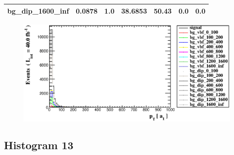 \documentclass[a4paper, 10pt]{article}
\begin{document}
\begin{table}[H]
\begin{center}
\begin{tabular}{|m{23.0mm}|m{23.0mm}|m{18.0mm}|m{19.0mm}|m{19.0mm}|m{19.0mm}|m{19.0mm}|}
      \hline
      {\cellcolor{white}         bg\_dip\_1600\_inf}& {\cellcolor{white}         0.0878}& {\cellcolor{white}         1.0}& {\cellcolor{white}         38.6853}& {\cellcolor{white}         50.43}& {\cellcolor{green}         0.0}& {\cellcolor{green}         0.0}\\
\hline
    \end{tabular}
  \end{center}
\end{table}

\begin{figure}[H]
  \begin{center}
    \includegraphics[scale=0.45]{selection_11.eps}\\
\caption{   }
  \end{center}
\end{figure}
      \newpage
\subsection{ Histogram 13}
\end{document}
